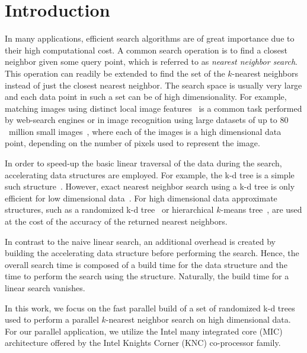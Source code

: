 \section{Introduction}
  \label{sec:intro}


   In many applications, efficient search algorithms are of 
  great importance due to their high computational cost.  A common search 
  operation is to find a closest neighbor given some query point, which is 
  referred to as \emph{nearest neighbor search}.  This operation can readily be 
  extended to find the set of the $k$-nearest neighbors instead of just the 
  closest nearest neighbor.  The search space is usually very large and each 
  data point in such a set can be of high dimensionality.  For example, 
  matching images using distinct local image features~\cite{lowe2004a} is 
  a common task performed by web-search engines or in image recognition using 
  large datasets of up to $80$~million small images~\cite{torralba2008a}, where 
  each of the images is a high dimensional data point, depending on the number 
  of pixels used to represent the image.

  In order to speed-up the basic linear traversal of the data during the 
  search, accelerating data structures are employed.  For example, the k-d tree 
  is a simple such structure~\cite{bentley1975a,friedman1977a}.  However, exact 
  nearest neighbor search using a k-d tree is only efficient for low dimensional 
  data~\cite{muja2009a}.  For high dimensional data approximate structures, 
  such as a randomized k-d tree~\cite{silpa2008a} or hierarchical $k$-means 
  tree~\cite{muja2009a}, are used at the cost of the accuracy of the returned 
  nearest neighbors.

  In contrast to the naive linear search, an additional overhead is created by 
  building the accelerating data structure before performing the search.  
  Hence, the overall search time is composed of a build time for the data 
  structure and the time to perform the search using the structure.  Naturally, 
  the build time for a linear search vanishes.

  In this work, we focus on the fast parallel build of a set of randomized 
  k-d trees used to perform a parallel $k$-nearest neighbor search on high 
  dimensional data.  For our parallel application, we utilize the Intel many 
  integrated core (MIC) architecture offered by the Intel Knights Corner (KNC) 
  co-processor family.

